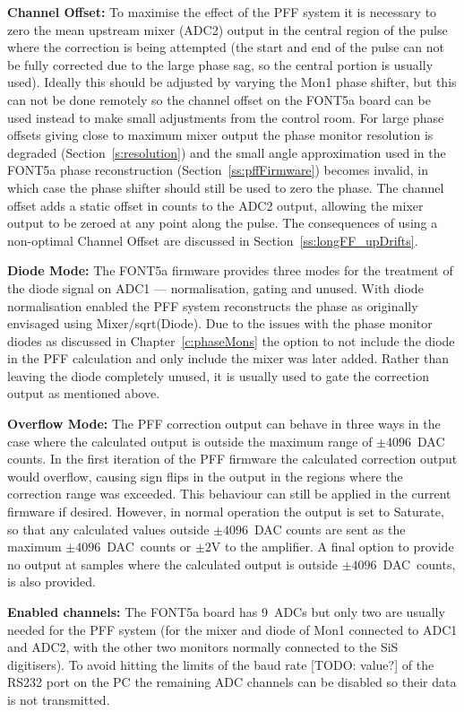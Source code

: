 \textbf{Channel Offset:} To maximise the effect of the PFF system it is necessary to zero the mean upstream mixer (ADC2) output in the central region of the pulse where the correction is being attempted (the start and end of the pulse can not be fully corrected due to the large phase sag, so the central portion is usually used). Ideally this should be adjusted by varying the Mon1 phase shifter, but this can not be done remotely so the channel offset on the FONT5a board can be used instead to make small adjustments from the control room. For large phase offsets giving close to maximum mixer output the phase monitor resolution is degraded (Section~\ref{s:resolution}) and the small angle approximation used in the FONT5a phase reconstruction (Section~\ref{ss:pffFirmware}) becomes invalid, in which case the phase shifter should still be used to zero the phase. The channel offset adds a static offset in counts to the ADC2 output, allowing the mixer output to be zeroed at any point along the pulse. The consequences of using a non-optimal Channel Offset are discussed in Section~\ref{ss:longFF_upDrifts}.

\textbf{Diode Mode:} The FONT5a firmware provides three modes for the treatment of the diode signal on ADC1 --- normalisation, gating and unused. With diode normalisation enabled the PFF system reconstructs the phase as originally envisaged using Mixer/sqrt(Diode). Due to the issues with the phase monitor diodes as discussed in Chapter~\ref{c:phaseMons} the option to not include the diode in the PFF calculation and only include the mixer was later added. Rather than leaving the diode completely unused, it is usually used to gate the correction output as mentioned above.

\textbf{Overflow Mode:} The PFF correction output can behave in three ways in the case where the calculated output is outside the maximum range of \(\pm4096\)~DAC counts. In the first iteration of the PFF firmware the calculated correction output would overflow, causing sign flips in the output in the regions where the correction range was exceeded. This behaviour can still be applied in the current firmware if desired. However, in normal operation the output is set to Saturate, so that any calculated values outside \(\pm4096\)~DAC counts are sent as the maximum \(\pm4096\)~DAC~counts or \(\pm2\)V to the amplifier. A final option to provide no output at samples where the calculated output is outside \(\pm4096\)~DAC~counts, is also provided.

\textbf{Enabled channels:} The FONT5a board has 9~ADCs but only two are usually needed for the PFF system (for the mixer and diode of Mon1 connected to ADC1 and ADC2, with the other two monitors normally connected to the SiS digitisers). To avoid hitting the limits of the baud rate  [TODO: value?] of the RS232 port on the PC the remaining ADC channels can be disabled so their data is not transmitted.

